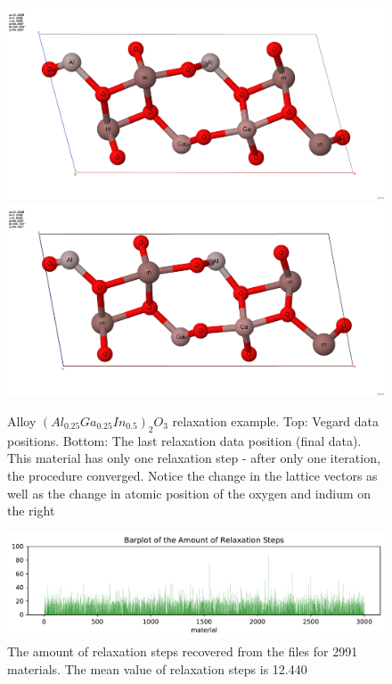 \documentclass[11pt,oneside,czech,american]{book} %
\theoremstyle{plain}
\theoremstyle{definition}
\begin{document}
\begin{figure}[H]       
	\includegraphics[scale=0.25]{train_id_20_vegard_hotovo.png}
	\includegraphics[scale=0.25]{train_id_20_final_hotovo.png}
	\caption{Alloy $(Al_{0.25}Ga_{0.25}In_{0.5})_2 O_3$ relaxation example. Top: Vegard data positions. Bottom: The last relaxation data position (final data). This material has only one relaxation step - after only one iteration, the procedure converged. Notice the change in the lattice vectors as well as the change in atomic position of the oxygen and indium on the right \parencite{jmol}}
	\label{relaxation}
\end{figure}

\begin{figure}[H]
	\includegraphics[scale=0.8]{rsn.pdf}
	\caption{The amount of relaxation steps recovered from the files for 2991 materials. The mean value of relaxation steps is 12.440}
	\label{rsn_barplot}
\end{figure}
\end{document}
